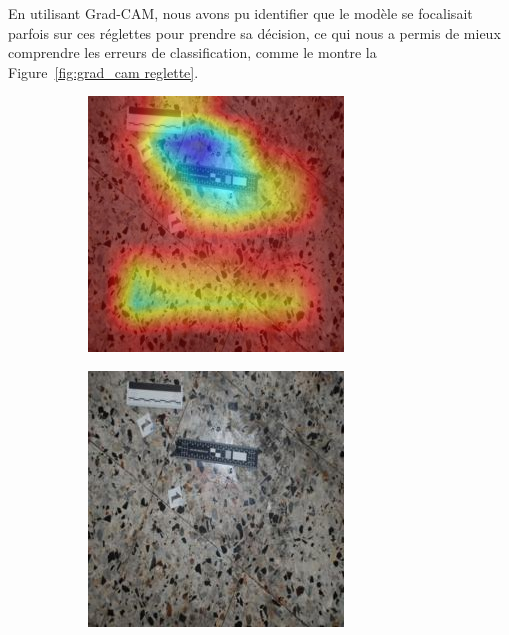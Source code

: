 En utilisant Grad-CAM, nous avons pu identifier que le modèle se focalisait parfois sur ces réglettes pour prendre sa décision, ce qui nous a permis de mieux comprendre les erreurs de classification, comme le montre la Figure~\ref{fig:grad_cam reglette}.

\begin{figure}[ht]
    \centering
    \begin{subfigure}{0.35\linewidth}
        \centering
        \includegraphics[width=\linewidth]{../asset/exemple/attention_reglette.jpg}
    \end{subfigure}
    \begin{subfigure}{0.35\linewidth}
        \centering
        \includegraphics[width=\linewidth]{../asset/exemple/attention_reglette_image.jpg}

\end{subfigure}
\end{figure}
